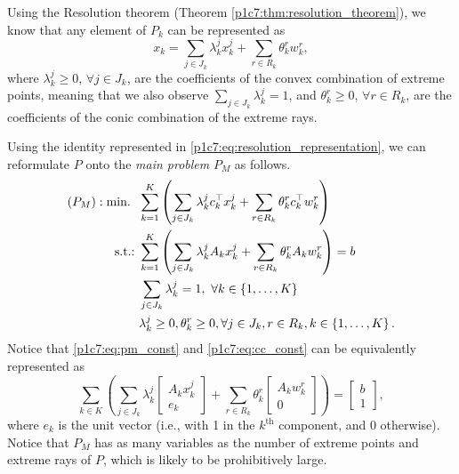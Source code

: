 Using the Resolution theorem (Theorem \ref{p1c7:thm:resolution_theorem}), we know that any element of $P_k$ can be represented as 
%
\begin{equation} \label{p1c7:eq:resolution_representation}
	x_k = \sum_{j \in J_k} \lambda_k^j x_k^j + \sum_{r \in R_k} \theta_k^r w_k^r, 	
\end{equation}
%
where $\lambda_k^j \geq 0$, $\forall j \in J_k$, are the coefficients of the convex combination of extreme points, meaning that we also observe $\sum_{j \in J_k} \lambda_k^j = 1$, and $\theta_k^r \geq 0$, $\forall r \in R_k$, are the coefficients of the conic combination of the extreme rays.

Using the identity represented in \eqref{p1c7:eq:resolution_representation}, we can reformulate $P$ onto the \emph{main problem} $P_M$ as follows.
%
\begin{align} 
	(P_M) : \mathop{\text{min.~}} \ & \sum_{k =1}^K \left(\sum_{j \in J_k} \lambda_k^jc_k ^\top x^j_k   + \sum_{r \in R_k} \theta_{k}^rc_k^\top w_k^r \right)	\nonumber\\
	\mathop{\text{s.t.:~}} & \sum_{k = 1}^K \left(\sum_{j \in J_k}\lambda_k^j A_k x_k^j + \sum_{r \in R_k} \theta_k^r A_k w_k^r\right) = b \label{p1c7:eq:pm_const}\\
	& \sum_{j \in J_k}\lambda_k^j = 1, \ \forall k \in \left\{ 1, \dots, K \right \} \label{p1c7:eq:cc_const}\\
	& \lambda_k^j \geq 0,  \theta_k^r \geq 0, \forall j \in J_k, r \in R_k, k \in \left\{ 1, \dots, K \right \}. \nonumber 
\end{align}
%
Notice that \eqref{p1c7:eq:pm_const} and \eqref{p1c7:eq:cc_const} can be equivalently represented as
%
\begin{equation*}
	\sum_{k \in K}\left(\sum_{j \in J_k}\lambda_k^j \begin{bmatrix} A_kx_k^j \\ e_k\end{bmatrix} + \sum_{r \in R_k}\theta_k^r \begin{bmatrix} A_kw_k^r \\ 0\end{bmatrix}\right) = \begin{bmatrix} b \\ 1\end{bmatrix},
\end{equation*}
%	  	   
where $e_k$ is the unit vector (i.e., with 1 in the $k^\text{th}$ component, and $0$ otherwise). Notice that $P_M$ has as many variables as the number of extreme points and extreme rays of $P$, which is likely to be prohibitively large.

